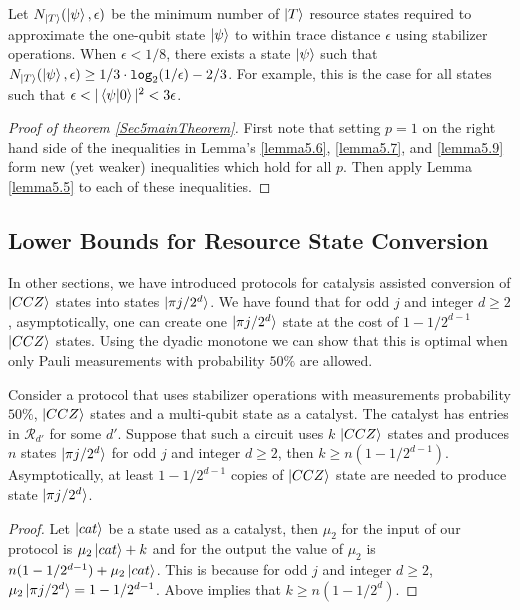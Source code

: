 \documentclass[12pt]{dalthesis}
\begin{document}
\begin{lemma}
\label{lemma5.9}
Let $N_{\ket{T}}(\ket{\psi} , \epsilon)$ be the minimum number of $\ket{T}$ resource states required to approximate the one-qubit state $\ket{\psi}$ to within trace distance $\epsilon$ using stabilizer operations. When $\epsilon < 1/8$, there exists a state $\ket{\psi}$ such that $N_{\ket{T}}(\ket{\psi} , \epsilon) \geq 1/3 \cdot \texttt{log}_2(1/\epsilon) - 2/3$. For example, this is the case for all states such that $\epsilon < |\braket{\psi | 0}|^2 < 3\epsilon$.
\end{lemma}

\begin{proof}[Proof of theorem \ref{Sec5mainTheorem}]
First note that setting $p=1$ on the right hand side of the inequalities in Lemma's   \ref{lemma5.6}, \ref{lemma5.7}, and \ref{lemma5.9} form new (yet weaker) inequalities which hold for all $p$. Then apply Lemma \ref{lemma5.5} to each of these inequalities.
\end{proof}







\subsection{Lower Bounds for Resource State Conversion}
In other sections, we have introduced protocols for catalysis assisted conversion of $\ket{CCZ}$ states into states $\ket{\pi j /2^d}$. We have found that for odd $j$ and integer $d \geq 2$, asymptotically, one can create one $\ket{\pi j /2^d}$ state at the cost of $1 - 1/2^{d-1}$ $\ket{CCZ}$ states. Using the dyadic monotone we can show that this is optimal when only Pauli measurements with probability $50 \% $ are allowed.


\begin{lemma}
Consider a protocol that uses stabilizer operations with measurements probability $50 \% $, $\ket{CCZ}$ states and a multi-qubit state as a catalyst. The catalyst has entries in $\mathcal{R}_{d'}$ for some $d'$. Suppose that such a circuit uses $k$ $\ket{CCZ}$ states and produces $n$ states $\ket{\pi j/2^d}$ for odd $j$ and integer $d \geq 2$, then $k \geq n(1-1/2^{d-1})$. Asymptotically, at least $1 - 1/2^{d-1}$ copies of $\ket{CCZ}$ state are needed to produce state $\ket{\pi j/2^d}$.
\end{lemma}
\begin{proof}
Let $\ket{cat}$ be a state used as a catalyst, then $\mu_2$ for the input of our protocol is $\mu_2 \ket{cat} + k$ and for the output the value of $\mu_2$ is $n(1-1/2^{d-1}) + \mu_2\ket{cat}$. This is because for odd $j$ and integer $d \geq 2$, $\mu_2 \ket{\pi j/2^d} = 1 - 1/2^{d-1}$. Above implies that $k \geq n(1 - 1/2^d)$.
\end{proof}
\end{document}
